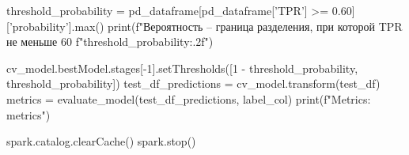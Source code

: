 \begin{code}
threshold_probability = pd_dataframe[pd_dataframe['TPR'] >= 0.60]['probability'].max()
print(f"Вероятность -- граница разделения, при которой TPR не меньше 60%
      f"{threshold_probability:.2f}")

cv_model.bestModel.stages[-1].setThresholds([1 - threshold_probability,
                                             threshold_probability])
test_df_predictions = cv_model.transform(test_df)
metrics = evaluate_model(test_df_predictions, label_col)
print(f"Metrics: {metrics}")

spark.catalog.clearCache()
spark.stop()
\end{code}